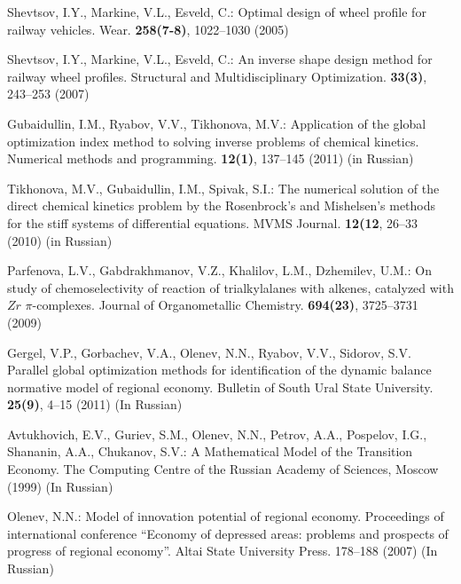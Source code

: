 \begin{thebibliography}{99.}

Shevtsov, I.Y., Markine, V.L., Esveld, C.: Optimal design of wheel profile for railway vehicles. Wear. \textbf{258(7-8)}, 1022--1030 (2005)

Shevtsov, I.Y., Markine, V.L., Esveld, C.: An inverse shape design method for railway wheel profiles. Structural and Multidisciplinary Optimization. \textbf{33(3)}, 243--253 (2007)

Gubaidullin, I.M., Ryabov, V.V., Tikhonova, M.V.: Application of the global optimization index method to solving inverse problems of chemical kinetics. Numerical methods and programming. \textbf{12(1)}, 137--145 (2011) (in Russian)

Tikhonova, M.V., Gubaidullin, I.M., Spivak, S.I.: The numerical solution of the direct chemical kinetics problem by the Rosenbrock's and Mishelsen's methods for the stiff systems of differential equations. MVMS Journal. \textbf{12(12}, 26--33 (2010) (in Russian)

Parfenova, L.V., Gabdrakhmanov, V.Z., Khalilov, L.M., Dzhemilev, U.M.: On study of chemoselectivity of reaction of trialkylalanes with alkenes, catalyzed with $Zr$ $\pi$-complexes. Journal of Organometallic Chemistry. \textbf{694(23)}, 3725--3731 (2009)

Gergel, V.P., Gorbachev, V.A., Olenev, N.N., Ryabov, V.V., Sidorov, S.V. Parallel global optimization methods for identification of the dynamic balance normative model of regional economy. Bulletin of South Ural State University. \textbf{25(9)}, 4--15 (2011) (In Russian)

Avtukhovich, E.V., Guriev, S.M., Olenev, N.N., Petrov, A.A., Pospelov, I.G., Shananin, A.A., Chukanov, S.V.: A Mathematical Model of the Transition Economy. The Computing Centre of the Russian Academy of Sciences, Moscow (1999) (In Russian)

Olenev, N.N.: Model of innovation potential of regional economy. Proceedings of international conference ``Economy of depressed areas: problems and prospects of progress of regional economy''. Altai State University Press. 178--188 (2007) (In Russian)




\end{thebibliography}

%
